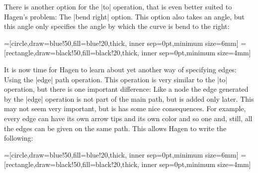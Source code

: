 There is another option for the |to| operation, that is even better
suited to Hagen's problem: The |bend right| option. This option also
takes an angle, but this angle only specifies the angle by which the
curve is bend to the right:

{
=[circle,draw=blue!50,fill=blue!20,thick,
                   inner sep=0pt,minimum size=6mm]
=[rectangle,draw=black!50,fill=black!20,thick,
                        inner sep=0pt,minimum size=4mm]
\begin{codeexample}[]
\end{codeexample}
}

It is now time for Hagen to learn about yet another way of specifying
edges: Using the |edge| path operation. This operation is very similar
to the |to| operation, but there is one important difference: Like a
node the edge generated by the |edge| operation is not part of the
main path, but is added only later. This may not seem very important,
but is has some nice consequences. For example, every edge can have
its own arrow tips and its own color and so one and, still, all the
edges can be given on the same path. This allows Hagen to write the
following: 


{
=[circle,draw=blue!50,fill=blue!20,thick,
                   inner sep=0pt,minimum size=6mm]
=[rectangle,draw=black!50,fill=black!20,thick,
                        inner sep=0pt,minimum size=4mm]
\begin{codeexample}[]
\end{codeexample}
}

